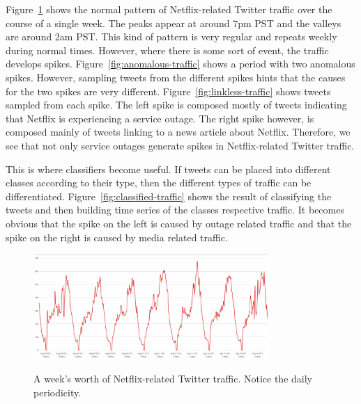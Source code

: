 \documentclass[12pt]{ucthesis}
\newcommand{\captionfonts}{\small\bf\ssp}
\begin{document}
Figure~\ref{fig:normal-traffic} shows the normal pattern of Netflix-related Twitter traffic over the course of a single week.
The peaks appear at around 7pm PST and the valleys are around 2am PST.
This kind of pattern is very regular and repeats weekly during normal times.
However, where there is some sort of event, the traffic develops spikes. Figure~\ref{fig:anomalous-traffic} shows a period with two
anomalous spikes. However, sampling tweets from the different spikes hints that the causes for the two spikes
are very different. Figure~\ref{fig:linkless-traffic} shows tweets sampled from each spike. The left spike is composed mostly
of tweets indicating that Netflix is experiencing a service outage. The right spike however, is composed mainly of tweets linking to
a news article about Netflix. Therefore, we see that not only service outages generate spikes in Netflix-related Twitter traffic.

This is where classifiers become useful. If tweets can be placed into different classes according to their type,
then the different types of traffic can be differentiated. Figure~\ref{fig:classified-traffic} shows the result of classifying
the tweets and then building time series of the classes respective traffic. It becomes obvious that the spike on the left is caused by
outage related traffic and that the spike on the right is caused by media related traffic.

\begin{figure}
   \begin{center}
      \includegraphics[width=0.8\textwidth]{images/Normal_Traffic.eps}
      \captionfonts
      \caption[Normal Traffic]{A week's worth of Netflix-related Twitter traffic. Notice the daily periodicity.}
      \label{fig:normal-traffic}
   \end{center}
\end{figure}
\end{document}
